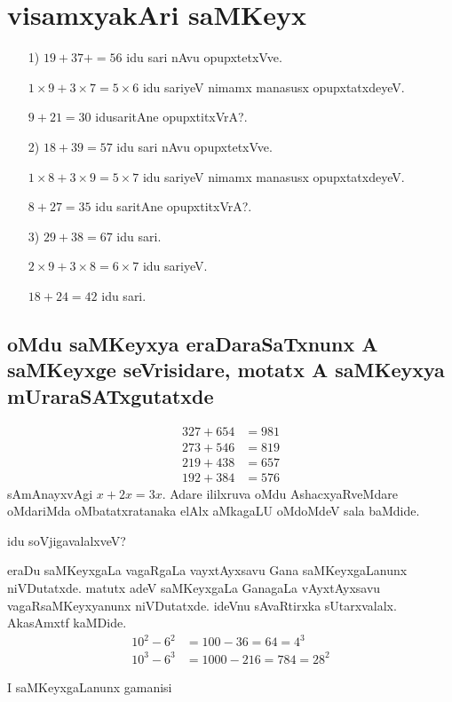 \chapter{visamxyakAri saMKeyx}

\begin{itemize}
\item[{\rm 1)}] $19+37+ = 56$ idu sari nAvu opupxtetxVve.

$1 \times 9+3 \times 7 = 5 \times 6 $ idu sariyeV nimamx manasusx opupxtatxdeyeV.

$9+21 =30$ idusaritAne opupxtitxVrA?.

\item[{\rm 2)}] $18+39 = 57$ idu sari nAvu opupxtetxVve.

$1 \times 8+3 \times 9 = 5 \times 7 $  idu sariyeV nimamx manasusx opupxtatxdeyeV.

$8 + 27 = 35$ idu saritAne opupxtitxVrA?.

\item[{\rm 3)}] $29 + 38 = 67$ idu sari.

$2\times 9 + 3 \times 8 = 6 \times 7$ idu sariyeV.

$18+24 = 42$ idu sari.
\end{itemize}

\section*{oMdu saMKeyxya eraDaraSaTxnunx A saMKeyxge seVrisidare, motatx A saMKeyxya mUraraSATxgutatxde}
\begin{align*}
327+654 &= 981\\
273+546 &= 819\\
219+438 &= 657\\
192+384 &= 576
\end{align*}
sAmAnayxvAgi $x+2x=3x$. Adare ililxruva oMdu AshacxyaRveMdare oMdariMda oMbatatxratanaka elAlx aMkagaLU oMdoMdeV sala baMdide.

idu soVjigavalalxveV?

eraDu saMKeyxgaLa vagaRgaLa vayxtAyxsavu Gana saMKeyxgaLanunx niVDutatxde. matutx adeV saMKeyxgaLa GanagaLa vAyxtAyxsavu vagaRsaMKeyxyanunx niVDutatxde. ideVnu sAvaRtirxka sUtarxvalalx. AkasAmxtf kaMDide.
\begin{align*}
10^2-6^2 &= 100-36 = 64 = 4^3\\
10^3-6^3 &= 1000-216 = 784 = 28^2
\end{align*}

I saMKeyxgaLanunx gamanisi

